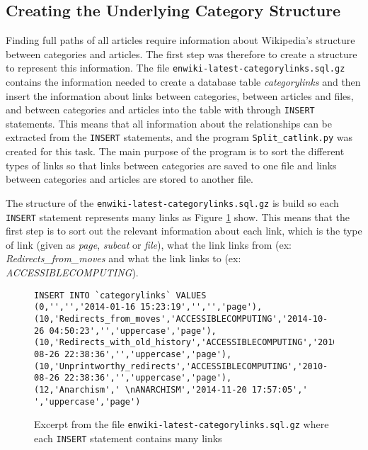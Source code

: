 
\subsection{Creating the Underlying Category Structure}
Finding full paths of all articles require information about Wikipedia's structure between categories and articles. The first step was therefore to create a structure to represent this information. The file \texttt{enwiki-latest-categorylinks.sql.gz} contains the 
information needed to create a database table \emph{categorylinks} and then insert the information about links between categories, between articles and files, and between categories and articles into the table with through \texttt{INSERT} statements. %
This means that all information about the relationships can be extracted from the \texttt{INSERT} statements, and the program \texttt{Split\_catlink.py} was created for this task. The main purpose of the program is to sort the different types of links so that links between categories are saved to one file and links between categories and articles are stored to another file. 

The structure of the \texttt{enwiki-latest-categorylinks.sql.gz} is build
so each \texttt{INSERT} statement represents many links as Figure \ref{fig:categorylinks} show. This means that the first step is to sort out the relevant information about each link, which is the type of link (given as \emph{page}, \emph{subcat} or \emph{file}), what the link links from (ex: \emph{Redirects\_from\_moves} and what the link links to (ex: \emph{ACCESSIBLECOMPUTING}). 

\begin{figure}[ht]
\begin{lstlisting}
INSERT INTO `categorylinks` VALUES 
(0,'','','2014-01-16 15:23:19','','','page'),
(10,'Redirects_from_moves','ACCESSIBLECOMPUTING','2014-10-26 04:50:23','','uppercase','page'),
(10,'Redirects_with_old_history','ACCESSIBLECOMPUTING','2010-08-26 22:38:36','','uppercase','page'),
(10,'Unprintworthy_redirects','ACCESSIBLECOMPUTING','2010-08-26 22:38:36','','uppercase','page'),
(12,'Anarchism',' \nANARCHISM','2014-11-20 17:57:05',' ','uppercase','page')
\end{lstlisting}
\caption[Excerpt from \texttt{enwiki-latest-categorylinks.sql.gz}]{Excerpt from the file \texttt{enwiki-latest-categorylinks.sql.gz} where each \texttt{INSERT} statement contains many links}
\label{fig:categorylinks}
\end{figure}

